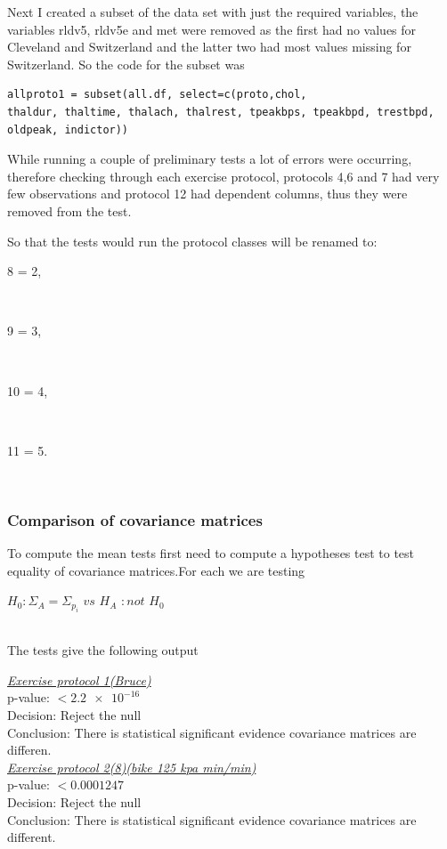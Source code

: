 \documentclass[a4paper]{article}
\begin{document}
Next I created a subset of the data set with just the required variables, the
variables rldv5, rldv5e and met were removed as the first had no values for
Cleveland and Switzerland and the latter two had most values missing for
Switzerland. So the code for the subset was
\begin{lstlisting}[frame=single]
allproto1 = subset(all.df, select=c(proto,chol,
thaldur, thaltime, thalach, thalrest, tpeakbps, tpeakbpd, trestbpd,
oldpeak, indictor))
\end{lstlisting}

While running a couple of preliminary tests a lot of errors were occurring,
therefore checking through each exercise protocol, protocols 4,6 and 7 had very
few observations and protocol 12 had dependent columns, thus they were removed
from the test.

So that the tests would run the protocol classes will be renamed to:\\
\centerline{8 = 2,}\\
\centerline{9 = 3,}\\
\centerline{10 = 4,}\\
\centerline{11 = 5.}\\

\newpage
\subsubsection{Comparison of covariance matrices}
To compute the mean tests first need to compute a hypotheses test to test
equality of covariance matrices.For each we are testing\\
\centerline{ $H_0 : \Sigma_A = \Sigma_{p_i}$ $vs$ $H_A $ $: not$  $H_0$}\\
The tests give the following output



\underline{\textit{Exercise protocol 1(Bruce)}}\\
p-value: $< \num{2.2e-16}$\\
Decision: Reject the null\\
Conclusion: There is statistical significant evidence covariance matrices
are differen.\\


\underline{\textit{Exercise protocol 2(8)(bike 125 kpa min/min)}}\\
p-value: $< \num{0.0001247}$\\
Decision: Reject the null\\
Conclusion: There is statistical significant evidence covariance matrices
are different.\\
\end{document}
